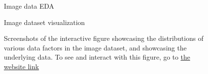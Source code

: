 \documentclass[
  letterpaper,
  DIV=11,
  numbers=noendperiod]{scrreprt}
\begin{document}
\begin{figure}

\begin{minipage}[t]{0.50\linewidth}

{\centering 


\caption{Image data EDA}

}

\end{minipage}%
%
\begin{minipage}[t]{0.50\linewidth}

{\centering 


\caption{Image dataset visualization}

}

\end{minipage}%

\caption{\label{fig-data-eda-pdf}Screenshots of the interactive figure
showcasing the distributions of various data factors in the image
dataset, and showcasing the underlying data. To see and interact with
this figure, go to
\href{https://cuboulder-ds.github.io/5301-5000-Final-Report/data.html}{the
website link}}

\end{figure}
\end{document}
